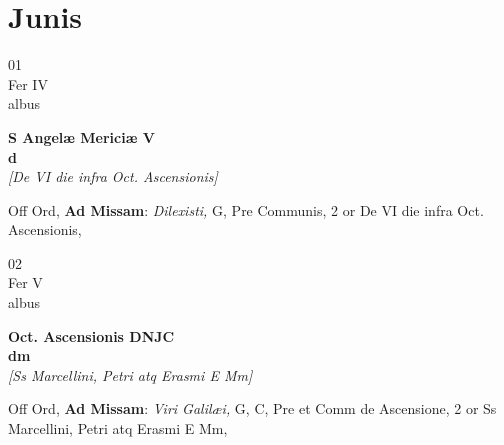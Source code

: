 \documentclass[10pt, openany]{book}
\begin{document}
        \chapter{Junis}
                        
        \begin{center}
            \begin{minipage}{3.5in}
                \vspace{2em}
                \begin{minipage}{0.5in}
                    {\Huge 01} \\
                    {\normalsize Fer IV} \\
                    {\normalsize albus}
                \end{minipage}
                \begin{minipage}{3.0in}
                    \textbf{ \large S Angelæ Mericiæ V \\
                    \textnormal{\normalsize d}} \\ \textit{[De VI die infra Oct. Ascensionis]} \\ 
                \end{minipage}
                \begin{justify}Off Ord, \textbf{Ad Missam}: \textit{Dilexisti,} G, Pre Communis, 2 or De VI die infra Oct. Ascensionis,  
                \end{justify}
            \end{minipage}
        \end{center}
    
        \begin{center}
            \begin{minipage}{3.5in}
                \vspace{2em}
                \begin{minipage}{0.5in}
                    {\Huge 02} \\
                    {\normalsize Fer V} \\
                    {\normalsize albus}
                \end{minipage}
                \begin{minipage}{3.0in}
                    \textbf{ \large Oct. Ascensionis DNJC \\
                    \textnormal{\normalsize dm}} \\ \textit{[Ss Marcellini, Petri atq Erasmi E Mm]} \\ 
                \end{minipage}
                \begin{justify}Off Ord, \textbf{Ad Missam}: \textit{Viri Galilæi,} G, C, Pre et Comm de Ascensione, 2 or Ss Marcellini, Petri atq Erasmi E Mm,  
                \end{justify}
            \end{minipage}
        \end{center}
    
\end{document}
